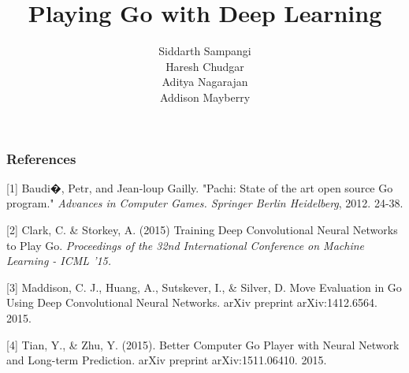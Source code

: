 \documentclass{article} %
\title{Playing Go with Deep Learning}
\author{
Siddarth Sampangi \\
\And
Haresh Chudgar \\
\AND
Aditya Nagarajan \\
\And
Addison Mayberry \\
}
\begin{document}
\maketitle











\subsubsection*{References}

\small{
[1] Baudi�, Petr, and Jean-loup Gailly. "Pachi: State of the art open source Go program." {\it Advances in Computer Games. Springer Berlin Heidelberg}, 2012. 24-38.

[2] Clark, C. \& Storkey, A. (2015) Training Deep Convolutional Neural Networks to Play Go. {\it Proceedings of the 32nd International Conference on Machine Learning - ICML '15.}

[3] Maddison, C. J., Huang, A., Sutskever, I., \& Silver, D. Move Evaluation in Go Using Deep Convolutional Neural Networks. arXiv preprint arXiv:1412.6564. 2015.

[4] Tian, Y., \& Zhu, Y. (2015). Better Computer Go Player with Neural Network and Long-term Prediction. arXiv preprint arXiv:1511.06410. 2015.
}
\end{document}
